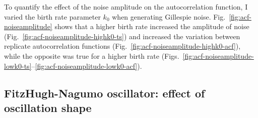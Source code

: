 

To quantify the effect of the noise amplitude on the autocorrelation function, I varied the birth rate parameter $k_{0}$ when generating Gillespie noise.
Fig.\ \ref{fig:acf-noiseamplitude} shows that a higher birth rate increased the amplitude of noise (Fig.\ \ref{fig:acf-noiseamplitude-highk0-ts}) and increased the variation between replicate autocorrelation functions (Fig.\ \ref{fig:acf-noiseamplitude-highk0-acf}), while the opposite was true for a higher birth rate (Figs.\ \ref{fig:acf-noiseamplitude-lowk0-ts}--\ref{fig:acf-noiseamplitude-lowk0-acf}).



\subsection{FitzHugh-Nagumo oscillator: effect of oscillation shape}
\label{subsec:analysis-characterisation-acf-fhn}

